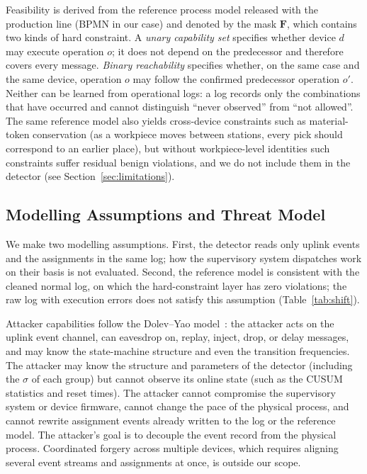 \documentclass[manuscript,screen,review]{acmart}
\begin{document}
Feasibility is derived from the reference process model released with the production line ({BPMN} in our case) and denoted by the mask $\mathbf F$, which contains two kinds of hard constraint. A \emph{unary capability set} specifies whether device $d$ may execute operation $o$; it does not depend on the predecessor and therefore covers every message. \emph{Binary reachability} specifies whether, on the same case and the same device, operation $o$ may follow the confirmed predecessor operation $o'$. Neither can be learned from operational logs: a log records only the combinations that have occurred and cannot distinguish ``never observed'' from ``not allowed''. The same reference model also yields cross-device constraints such as material-token conservation (as a workpiece moves between stations, every pick should correspond to an earlier place), but without workpiece-level identities such constraints suffer residual benign violations, and we do not include them in the detector (see Section~\ref{sec:limitations}).

\subsection{Modelling Assumptions and Threat Model}
\label{sec:assumptions}

We make two modelling assumptions. First, the detector reads only uplink events and the assignments in the same log; how the supervisory system dispatches work on their basis is not evaluated. Second, the reference model is consistent with the cleaned normal log, on which the hard-constraint layer has zero violations; the raw log with execution errors does not satisfy this assumption (Table~\ref{tab:shift}).

Attacker capabilities follow the {Dolev--Yao} model~\cite{dolev1983yao}: the attacker acts on the uplink event channel, can eavesdrop on, replay, inject, drop, or delay messages, and may know the state-machine structure and even the transition frequencies. The attacker may know the structure and parameters of the detector (including the $\sigma$ of each group) but cannot observe its online state (such as the {CUSUM} statistics and reset times). The attacker cannot compromise the supervisory system or device firmware, cannot change the pace of the physical process, and cannot rewrite assignment events already written to the log or the reference model. The attacker's goal is to decouple the event record from the physical process. Coordinated forgery across multiple devices, which requires aligning several event streams and assignments at once, is outside our scope.
\end{document}
